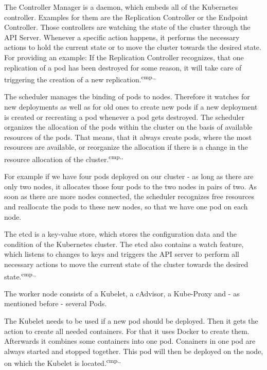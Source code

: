 The Controller Manager is a daemon, which embeds all of the Kubernetes controller. Examples for them are the Replication Controller or the Endpoint Controller. Those controllers are watching the state of the cluster through the API Server. Whenever a specific action happens, it performs the necessary actions to hold the current state or to move the cluster towards the desired state. For providing an example: If the Replication Controller recognizes, that one replication of a pod has been destroyed for some reason, it will take care of triggering the creation of a new replication.\textsuperscript{cmp.\cite{19}, \cite{22}}

The scheduler manages the binding of pods to nodes. Therefore it watches for new deployments as well as for old ones to create new pods if a new deployment is created or recreating a pod whenever a pod gets destroyed. The scheduler organizes the allocation of the pods within the cluster on the basis of available resources of the pods. That means, that it always create pods, where the most resources are available, or reorganize the allocation if there is a change in the resource allocation of the cluster.\textsuperscript{cmp.\cite{19}, \cite{22}}%

For example if we have four pods deployed on our cluster - as long as there are only two nodes, it allocates those four pods to the two nodes in pairs of two. As soon as there are more nodes connected, the scheduler recognizes free resources and reallocate the pods to these new nodes, so that we have one pod on each node.

The etcd is a key-value store, which stores the configuration data and the condition of the Kubernetes cluster. The etcd also contains a watch feature, which listens to changes to keys and triggers the API server to perform all necessary actions to move the current state of the cluster towards the desired state.\textsuperscript{cmp.\cite{19}, \cite{22}}

The worker node consists of a Kubelet, a cAdvisor, a Kube-Proxy and - as mentioned before - several Pods. 

The Kubelet needs to be used if a new pod should be deployed. Then it gets the action to create all needed containers. For that it uses Docker to create them. Afterwards it combines some containers into one pod. Conainers in one pod are always started and stopped together. This pod will then be deployed on the node, on which the Kubelet is located.\textsuperscript{cmp.\cite{19}, \cite{22}}

